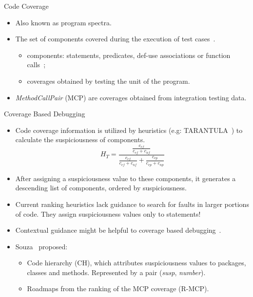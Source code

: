 \documentclass[handout]{beamer}
\begin{document}
\begin{frame}{Code Coverage}
    \begin{itemize}
        \item Also known as program spectra.
        \item The set of components covered during the execution of test
        cases~\cite{elbaum2001}.
        \begin{itemize}
            \item components: statements, predicates, def-use associations or
            function calls~\cite{Abreu2008};
            \item coverages obtained by testing the unit of the program.
        \end{itemize}
        \item \textit{MethodCallPair} (MCP) are coverages obtained from
        integration testing data.
    \end{itemize}
\end{frame}

\begin{frame}[allowframebreaks]{Coverage Based Debugging}

    \begin{itemize}
        \item Code coverage information is utilized by heuristics (e.g:
        TARANTULA~\cite{jones2002visualization}) to calculate the suspiciousness
        of components. \begin{equation}H_{T} = \frac{\frac{c_{ef}}{c_{ef} +
        c_{nf}}}{\frac{c_{ef}}{c_{ef} + c_{nf}} + \frac{c_{ep}}{c_{ep} +
        c_{np}}} \end{equation}
        \item After assigning a suspiciousness value to these components, it
        generates a descending list of components, ordered by suspiciousness.
        \item Current ranking heuristics lack guidance to search for faults in
        larger portions of code. They assign suspiciousness values only to
        statements!
        \framebreak
        \item Contextual guidance might be helpful to coverage based
        debugging~\cite{parnin2011automated}.
        \item Souza~\cite{souza2012depuracao} proposed:
        \begin{itemize}
            \item Code hierarchy (CH), which attributes suspiciousness values to
            packages, classes and methods. Represented by a pair (\textit{susp},
            \textit{number}).
            \item Roadmaps from the ranking of the MCP coverage (R-MCP).
        \end{itemize}
    \end{itemize}

\end{frame}
\end{document}
